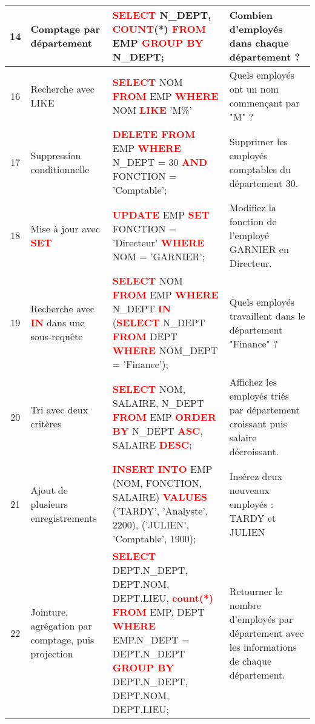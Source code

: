 \documentclass[a4paper, landscape]{article}
\begin{document}
\begin{longtable}{|c|l|p{}|p{}|}
    \hline
    14 & Comptage par département & \textcolor{red}{\textbf{SELECT}} N\_DEPT, \textcolor{red}{\textbf{COUNT}}(*) \textcolor{red}{\textbf{FROM}} EMP \textcolor{red}{\textbf{GROUP BY}} N\_DEPT; \newline \newline & Combien d'employés dans chaque département ? \\
    \hline
    16 & Recherche avec LIKE & \textcolor{red}{\textbf{SELECT}} NOM \textcolor{red}{\textbf{FROM}} EMP \textcolor{red}{\textbf{WHERE}} NOM \textcolor{red}{\textbf{LIKE}} 'M\%' \newline \newline & Quels employés ont un nom commençant par "M" ? \\
    \hline
    17 & Suppression conditionnelle & \textcolor{red}{\textbf{DELETE FROM}} EMP \textcolor{red}{\textbf{WHERE}} N\_DEPT = 30 \textcolor{red}{\textbf{AND}} FONCTION = 'Comptable';\newline \newline& Supprimer les employés comptables du département 30. \\
    \hline
    18 & Mise à jour avec \textcolor{red}{\textbf{SET}} & \textcolor{red}{\textbf{UPDATE}} EMP \textcolor{red}{\textbf{SET}} FONCTION = 'Directeur' \textcolor{red}{\textbf{WHERE}} NOM = 'GARNIER'; & Modifiez la fonction de l'employé GARNIER en Directeur. \\
    \hline
    19 & Recherche avec \textcolor{red}{\textbf{IN}} dans une sous-requête & \textcolor{red}{\textbf{SELECT}} NOM \textcolor{red}{\textbf{FROM}} EMP \textcolor{red}{\textbf{WHERE}} N\_DEPT \textcolor{red}{\textbf{IN}} (\textcolor{red}{\textbf{SELECT}} N\_DEPT \textcolor{red}{\textbf{FROM}} DEPT \textcolor{red}{\textbf{WHERE}} NOM\_DEPT = 'Finance'); & Quels employés travaillent dans le département "Finance" ? \\
    \hline
    20 & Tri avec deux critères & \textcolor{red}{\textbf{SELECT}} NOM, SALAIRE, N\_DEPT \textcolor{red}{\textbf{FROM}} EMP \textcolor{red}{\textbf{ORDER BY}} N\_DEPT \textcolor{red}{\textbf{ASC}}, SALAIRE \textcolor{red}{\textbf{DESC}}; & Affichez les employés triés par département croissant puis salaire décroissant. \\
    \hline
    21 & Ajout de plusieurs enregistrements & \textcolor{red}{\textbf{INSERT INTO}} EMP (NOM, FONCTION, SALAIRE) \textcolor{red}{\textbf{VALUES}} ('TARDY', 'Analyste', 2200), ('JULIEN', 'Comptable', 1900); & Insérez deux nouveaux employés : TARDY et JULIEN \\
    \hline
    
    22 & Jointure, agrégation par comptage, puis projection & \textcolor{red}{\textbf{SELECT}} DEPT.N\_DEPT, DEPT.NOM, DEPT.LIEU, \textcolor{red}{\textbf{count(*)}} \textcolor{red}{\textbf{FROM}} EMP, DEPT \textcolor{red}{\textbf{WHERE}} EMP.N\_DEPT = DEPT.N\_DEPT \textcolor{red}{\textbf{GROUP BY}} DEPT.N\_DEPT, DEPT.NOM, DEPT.LIEU; & Retourner le nombre d'employés par département avec les informations de chaque département. \\
\hline

\end{longtable}
\end{document}
